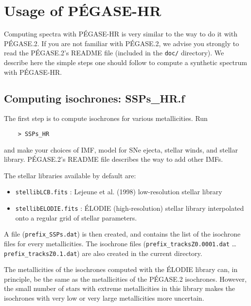\documentclass[11pt,fleqn]{article}
\begin{document}
\section{Usage of P\'EGASE-HR}
Computing spectra with P\'EGASE-HR is very similar to the way to do it
with P\'EGASE.2. If you are not familiar with P\'EGASE.2, we advise you
strongly to read the P\'EGASE.2's  README file (included in the
\texttt{doc/} directory). We describe here the simple steps one should
follow to compute a synthetic spectrum with P\'EGASE-HR.
\subsection{Computing isochrones: SSPs\_HR.f}
The first step is to compute isochrones for various metallicities.
Run 
\begin{verbatim}
    > SSPs_HR
\end{verbatim}
and make your choices of IMF, model for SNe ejecta, stellar winds, and
stellar library. P\'EGASE.2's README file describes the way to add
other IMFs.

The stellar libraries available by default are:
\begin{itemize}
\item \texttt{stellibLCB.fits}    : Lejeune et al. (1998) low-resolution stellar library
\item \texttt{stellibELODIE.fits} : \'ELODIE (high-resolution) stellar library interpolated onto a
  regular grid of stellar parameters.
\end{itemize}

A file (\texttt{prefix\_SSPs.dat}) is then created, and contains the
list of the isochrone files for every metallicities. The isochrone
files (\texttt{prefix\_tracksZ0.0001.dat}
\ldots \texttt{prefix\_tracksZ0.1.dat}) are also created in the current
directory.

The metallicities of the isochrones computed with the \'ELODIE library
can, in principle, be the same as the metallicities of the P\'EGASE.2
isochrones. However, the small number of stars with extreme
metallicities in this library makes the isochrones with very low or
very large metallicities more uncertain.
\end{document}
